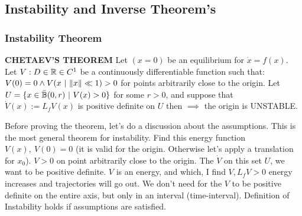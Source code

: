 \subsection{Instability and Inverse Theorem's}

\subsubsection{Instability Theorem}

\begin{thrm}{\textbf{CHETAEV'S THEOREM}} \newline
Let $(x=0)$ be an equilibrium for $\dot{x}=f(x)$. Let $V:D \in \mathbb{R} \in C^1$ be a continuously differentiable function such that: $V(0)=0 \land V(x\ |\ \lVert x\rVert \ll 1) > 0$ for points arbitrarily close to the origin.
Let $U = \{x \in \bar{\mathbb{B}}(0,r)\ |\ V(x) > 0\}$ for some $r>0$, and suppose that $\dot{V}(x):=L_fV(x)$ is positive definite on $U$ then $\implies$ the origin is UNSTABLE.
\end{thrm}

Before proving the theorem, let's do a discussion about the assumptions. This is the most general theorem for instability. Find this energy function $V(x),\ V(0) = 0$ (it is valid for the origin. Otherwise let's apply a translation for $x_0$). $V > 0$ on point arbitrarily close to the origin. The $\dot{V}$ on this set $U$, we want to be positive definite. $V$ is an energy, and which, I find $V,L_fV > 0$ energy increases and trajectories will go out. We don't need for the $V$ to be positive definite on the entire axis, but only in an interval (time-interval). Definition of Instability holds if assumptions are satisfied.

